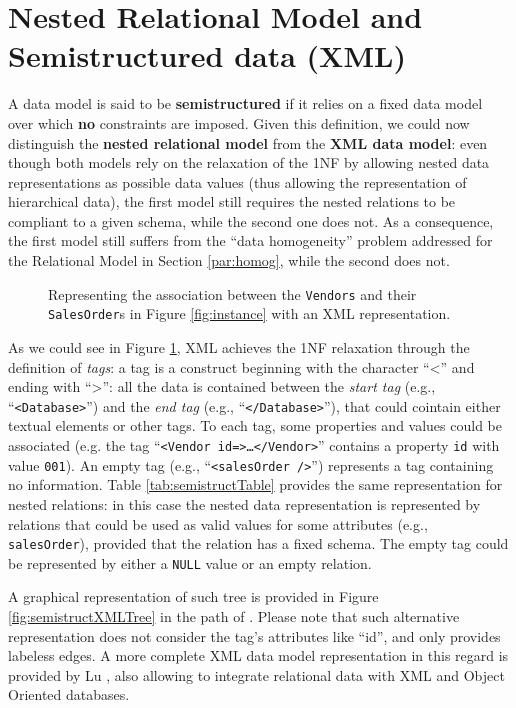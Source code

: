 
\section{Nested Relational Model and Semistructured data (XML)}\label{sec:semistructured}
A data model is said to be \textbf{semistructured} if it relies on a fixed data model over which \textbf{no} constraints are imposed. Given this definition, we could now distinguish the \textbf{nested relational model} from the \textbf{XML data model}: even though both models rely on the relaxation of the 1NF by allowing nested data representations as possible data values (thus allowing the representation of hierarchical data), the first model still requires the nested relations to be compliant to a given schema, while the second one does not. As a consequence, the first model still suffers from the ``data homogeneity'' problem addressed for the Relational Model in Section \vref{par:homog}, while the second does not. 

\begin{figure}[!hpt]

\caption{Representing the association between the \texttt{Vendors} and their \texttt{SalesOrder}s in Figure \ref{fig:instance} with an XML representation.}
\label{fig:semistructXML}
\end{figure}


\begin{example}
	As we could see in Figure \ref{fig:semistructXML}, XML achieves the 1NF relaxation through the definition of \textit{tags}: a tag is a construct beginning with the character ``<'' and ending with ``>'': all the data is contained between the \textit{start tag} (e.g., ``\texttt{<Database>}'') and the \textit{end tag} (e.g., ``\texttt{</Database>}''), that could cointain either textual elements or other tags. To each tag, some properties and values could be associated (e.g. the tag ``\texttt{<Vendor id=\textquotedbl>\dots </Vendor>}'' contains a property \texttt{id} with value \texttt{001}). An empty tag (e.g., ``\texttt{<salesOrder />}'') represents a tag containing no information. Table \ref{tab:semistructTable} provides the same representation for nested relations: in this case the nested data representation is represented by relations that could be used as valid values for some attributes (e.g., \texttt{salesOrder}), provided that the relation has a fixed schema. The empty tag could be represented by either a \texttt{NULL} value or an empty relation. 
	
	A graphical representation of such tree is provided in Figure \ref{fig:semistructXMLTree} in the path of \cite{Magnani06}. Please note that such alternative representation does not consider the tag's attributes like ``id'', and only provides labeless edges. A more complete XML data model representation in this regard is provided by Lu \cite{Lu2006}, also allowing to integrate relational data with XML and Object Oriented databases.
\end{example}

